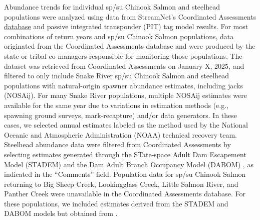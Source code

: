\documentclass[10pt,a4paper]{article}
\begin{document}
Abundance trends for individual sp/su Chinook Salmon and steelhead populations were analyzed using data from StreamNet's Coordinated Assessments \href{https://cax.streamnet.org}{database} and passive integrated transponder (PIT) tag model results. For most combinations of return years and sp/su Chinook Salmon populations, data originated from the Coordinated Assessments database and were produced by the state or tribal co-managers responsible for monitoring those populations. The dataset was retrieved from Coordinated Assessments on January X, 2025, and filtered to only include Snake River sp/su Chinook Salmon and steelhead populations with natural-origin spawner abundance estimates, including jacks (NOSAij). For many Snake River populations, multiple NOSAij estimates were available for the same year due to variations in estimation methods (e.g., spawning ground surveys, mark-recapture) and/or data generators. In these cases, we selected annual estimates labeled as the method used by the National Oceanic and Atmospheric Administration (NOAA) technical recovery team. Steelhead abundance data were filtered from Coordinated Assessments by selecting estimates generated through the STate-space Adult Dam Escapement Model (STADEM) \autocite{see_state-space_2021} and the Dam Adult Branch Occupancy Model (DABOM) \autocite{see_pit_2016,kinzer_snake_2020}, as indicated in the ``Comments'' field. Population data for sp/su Chinook Salmon returning to Big Sheep Creek, Lookingglass Creek, Little Salmon River, and Panther Creek were unavailable in the Coordinated Assessments database. For these populations, we included estimates derived from the STADEM and DABOM models but obtained from \textcite{kinzerSnakeRiverBasin2020}.
\end{document}
